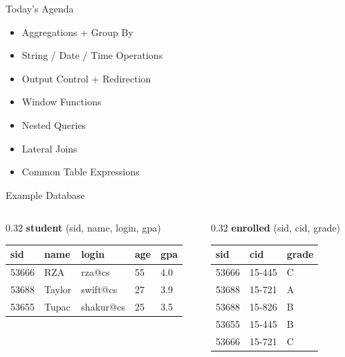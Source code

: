 \documentclass[aspectratio=169]{beamer}
\begin{document}
\begin{frame}{Today's Agenda}
    \begin{itemize}
        \item Aggregations + Group By
        \item String / Date / Time Operations
        \item Output Control + Redirection
        \item Window Functions
        \item Nested Queries
        \item Lateral Joins
        \item Common Table Expressions
    \end{itemize}
\end{frame}

\begin{frame}[fragile]{Example Database}
    
    \begin{columns}[t]
        \begin{column}{0.32\textwidth}
            \textbf{student} (sid, name, login, gpa)
            \begin{tabular}{|l|l|l|l|l|}
            \hline
            \textbf{sid} & \textbf{name} & \textbf{login} & \textbf{age} & \textbf{gpa} \\ \hline
            53666 & RZA & rza@cs & 55 & 4.0 \\ \hline
            53688 & Taylor & swift@cs & 27 & 3.9 \\ \hline
            53655 & Tupac & shakur@cs & 25 & 3.5 \\ \hline
            \end{tabular}
        \end{column}
        
        \begin{column}{0.32\textwidth}
            \textbf{enrolled} (sid, cid, grade)
            \begin{tabular}{|l|l|l|}
            \hline
            \textbf{sid} & \textbf{cid} & \textbf{grade} \\ \hline
            53666 & 15-445 & C \\ \hline
            53688 & 15-721 & A \\ \hline
            53688 & 15-826 & B \\ \hline
            53655 & 15-445 & B \\ \hline
            53666 & 15-721 & C \\ \hline
            \end{tabular}
        \end{column}
        

\end{columns}
\end{frame}
\end{document}
